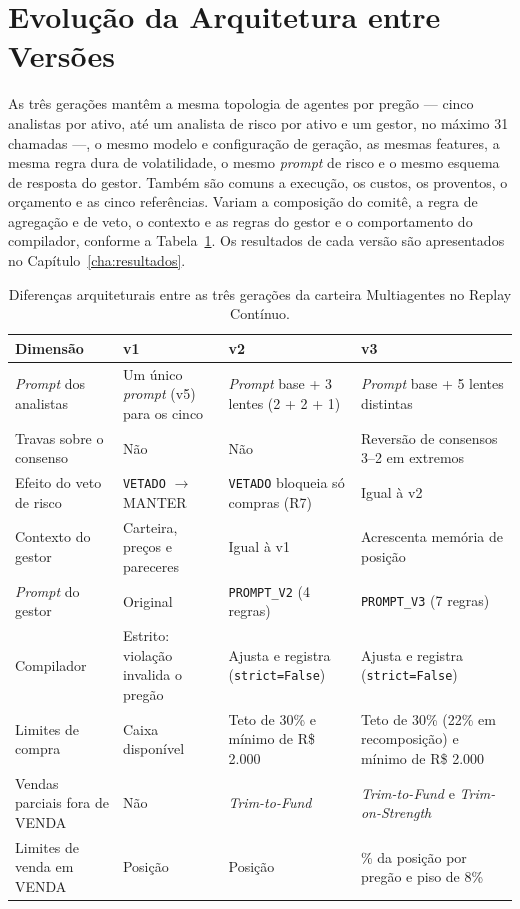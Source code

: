 \section{Evolução da Arquitetura entre Versões}
\label{sec:arq-evolucao}

As três gerações mantêm a mesma topologia de agentes por pregão --- cinco analistas por ativo, até um analista de risco por ativo e um gestor, no máximo 31 chamadas ---, o mesmo modelo e configuração de geração, as mesmas features, a mesma regra dura de volatilidade, o mesmo \textit{prompt} de risco e o mesmo esquema de resposta do gestor. Também são comuns a execução, os custos, os proventos, o orçamento e as cinco referências. Variam a composição do comitê, a regra de agregação e de veto, o contexto e as regras do gestor e o comportamento do compilador, conforme a Tabela~\ref{tab:evolucao-versoes}. Os resultados de cada versão são apresentados no Capítulo~\ref{cha:resultados}.

\begin{table}[htbp]
\centering
\caption{Diferenças arquiteturais entre as três gerações da carteira Multiagentes no Replay Contínuo.}
\label{tab:evolucao-versoes}
\small
\setlength{\tabcolsep}{4pt}
\begin{tabular}{>{\raggedright\arraybackslash}p{3.0cm} >{\raggedright\arraybackslash}p{3.8cm} >{\raggedright\arraybackslash}p{3.8cm} >{\raggedright\arraybackslash}p{4.0cm}}
\toprule
\textbf{Dimensão} & \textbf{v1} & \textbf{v2} & \textbf{v3} \\
\midrule
\textit{Prompt} dos analistas & Um único \textit{prompt} (v5) para os cinco & \textit{Prompt} base + 3 lentes (2 + 2 + 1) & \textit{Prompt} base + 5 lentes distintas \\
Travas sobre o consenso & Não & Não & Reversão de consensos 3--2 em extremos \\
Efeito do veto de risco & \texttt{VETADO} $\rightarrow$ MANTER & \texttt{VETADO} bloqueia só compras (R7) & Igual à v2 \\
Contexto do gestor & Carteira, preços e pareceres & Igual à v1 & Acrescenta memória de posição \\
\textit{Prompt} do gestor & Original & \texttt{PROMPT\_V2} (4 regras) & \texttt{PROMPT\_V3} (7 regras) \\
Compilador & Estrito: violação invalida o pregão & Ajusta e registra (\texttt{strict=False}) & Ajusta e registra (\texttt{strict=False}) \\
Limites de compra & Caixa disponível & Teto de 30\% e mínimo de R\$ 2.000 & Teto de 30\% (22\% em recomposição) e mínimo de R\$ 2.000 \\
Vendas parciais fora de VENDA & Não & \textit{Trim-to-Fund} & \textit{Trim-to-Fund} e \textit{Trim-on-Strength} \\
Limites de venda em VENDA & Posição & Posição & 45\% da posição por pregão e piso de 8\% \\
\bottomrule
\end{tabular}
\end{table}

